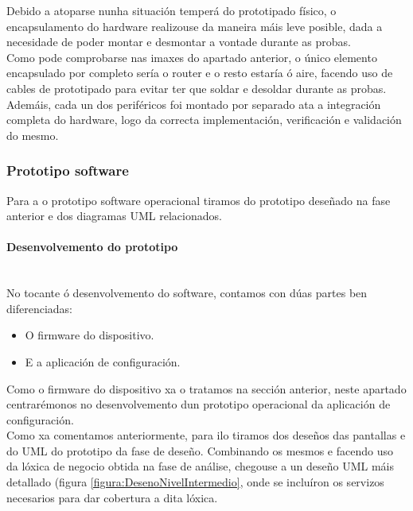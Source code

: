    Debido a atoparse nunha situación temperá do prototipado físico, o
   encapsulamento do hardware realizouse da maneira máis leve posible, dada a
   necesidade de poder montar e desmontar a vontade durante as probas. \\
   
   Como pode comprobarse nas imaxes do apartado anterior, o único elemento
   encapsulado por completo sería o router e o resto estaría ó aire, facendo uso
   de cables de prototipado para evitar ter que soldar e desoldar durante as
   probas. \\
   
   Ademáis, cada un dos periféricos foi montado por separado ata a integración
   completa do hardware, logo da correcta implementación, verificación e
   validación do mesmo.

  \subsubsection{Prototipo software}
  
  Para a o prototipo software operacional tiramos do prototipo deseñado na fase
  anterior e dos diagramas UML relacionados.

   \paragraph{Desenvolvemento do prototipo}\mbox{}\\
   
   No tocante ó desenvolvemento do software, contamos con dúas partes ben
   diferenciadas:
   
   \begin{itemize}
    \item O firmware do dispositivo.
    \item E a aplicación de configuración.
   \end{itemize}
   
   Como o firmware do dispositivo xa o tratamos na sección anterior, neste
   apartado centrarémonos no desenvolvemento dun prototipo operacional da
   aplicación de configuración. \\
   
   Como xa comentamos anteriormente, para ilo tiramos dos deseños das pantallas
   e do UML do prototipo da fase de deseño. Combinando os mesmos e facendo uso
   da lóxica de negocio obtida na fase de análise, chegouse a un deseño UML máis
   detallado (figura \ref{figura:DesenoNivelIntermedio}, onde se incluíron os
   servizos necesarios para dar cobertura a dita lóxica. \\
   
